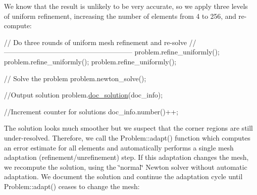 We know that the result is unlikely to be very accurate, so we apply three levels of uniform refinement, increasing the number of elements from 4 to 256, and re-\/compute\+:

 
\begin{DoxyCodeInclude}
 \textcolor{comment}{// Do three rounds of uniform mesh refinement and re-solve}
 \textcolor{comment}{//--------------------------------------------------------}
 problem.refine\_uniformly();
 problem.refine\_uniformly();
 problem.refine\_uniformly();
 
 \textcolor{comment}{// Solve the problem }
 problem.newton\_solve();
 
 \textcolor{comment}{//Output solution}
 problem.\hyperlink{classRefineableFishPoissonProblem_aeee1bf23216971b50b8822c45e62c48b}{doc\_solution}(doc\_info);
 
 \textcolor{comment}{//Increment counter for solutions }
 doc\_info.number()++;

\end{DoxyCodeInclude}


The solution looks much smoother but we suspect that the corner regions are still under-\/resolved. Therefore, we call the {\ttfamily Problem\+::adapt()} function which computes an error estimate for all elements and automatically performs a single mesh adaptation (refinement/unrefinement) step. If this adaptation changes the mesh, we recompute the solution, using the \char`\"{}normal\char`\"{} Newton solver without automatic adaptation. We document the solution and continue the adaptation cycle until {\ttfamily Problem\+::adapt()} ceases to change the mesh\+:

